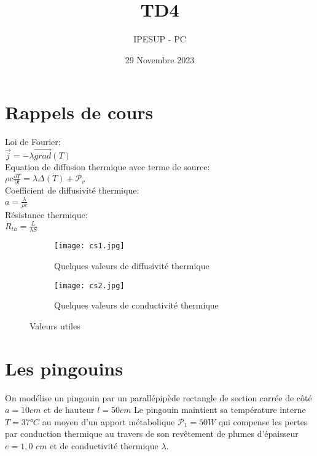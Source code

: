 \documentclass{article}
\title{TD4}
\author{IPESUP - PC }
\date{29 Novembre 2023}
\begin{document}
\maketitle



\section{Rappels de cours}
Loi de Fourier: 
\\[0.1cm]

$\vec{j}=-\lambda \vec{grad} (T) $
\\[0.1cm]

Equation de diffusion thermique avec terme de source:
\\[0.1cm]

$\rho c \frac{\partial T}{\partial t }=\lambda \Delta (T) + \mathcal{P}_v$ 
\\[0.2cm]
Coefficient de diffusivité thermique: 
\\[0.1cm]

$a=\frac{\lambda}{\rho c}$
 \\[0.1cm]

Résistance thermique: 
\\[0.1cm]

$R_{th} = \frac{L}{\lambda S}$


\begin{figure}[h]
  \centering
  \begin{subfigure}{0.3\textwidth}
    \texttt{[image: cs1.jpg]}
    \caption{Quelques valeurs de diffusivité thermique}
    \label{fig:subfig1}
  \end{subfigure}
  \hfill
  \begin{subfigure}{0.4\textwidth}
    \texttt{[image: cs2.jpg]}
    \caption{Quelques valeurs de conductivité thermique}
    \label{fig:subfig2}
  \end{subfigure}
  \caption{Valeurs utiles}
  \label{fig:general}
\end{figure}
 

\section{Les pingouins}
On modélise un pingouin par un parallépipède rectangle de section carrée de côté $a=10cm$ et de hauteur $l = 50 cm$  Le pingouin maintient sa température interne $T = 37 $°$ C$ au moyen
d'un apport métabolique $\mathcal{P}_1 = 50 W $ qui compense les pertes par conduction thermique au
travers de son revêtement de plumes d'épaisseur $e = 1,0 $ $cm$ et de conductivité thermique $\lambda$.
\end{document}
